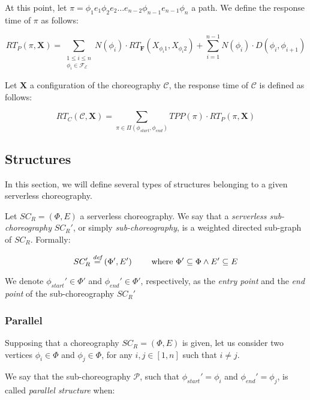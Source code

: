 At this point, let $\pi = \phi_1 e_1 \phi_2 e_2 \ldots e_{n-2}\phi_{n-1} e_{n-1} \phi_n$ a path. We define the response time of $\pi$ as follows:

\begin{equation}
	RT_P(\pi, \textbf{X}) = \sum_{\substack{1\le i\le n\\ \phi_i \in \mathscr{F_E}}} N(\phi_i) \cdot RT_{\textbf{F}} (X_{\phi_{i}1},X_{\phi_{i}2}) + \sum_{i = 1}^{n-1} N(\phi_i) \cdot D(\phi_i,\phi_{i+1})
\end{equation}

Let $\textbf{X}$ a configuration of the choreography $\mathcal{C}$, the response time of $\mathcal{C}$ is defined as follows:

\begin{equation}
	RT_C(\mathcal{C}, \textbf{X}) = \sum_{\pi \in \Pi(\phi_{start}, \phi_{end})} TPP(\pi) \cdot RT_{P}(\pi, \textbf{X})
\end{equation}

\subsection{Structures}

In this section, we will define several types of structures belonging to a given serverless choreography. 

Let $SC_R = (\Phi,E)$ a serverless choreography. We say that a \textit{serverless sub-choreography} $SC_R'$, or simply \textit{sub-choreography}, is a weighted directed sub-graph of $SC_R$. Formally:

\begin{equation}
	SC_R' \overset{\textit{def}}{=} (\Phi',E') \qquad \text{ where } \Phi' \subseteq \Phi \wedge E' \subseteq E
\end{equation}

We denote $\phi_{start}' \in \Phi'$ and $\phi_{end}' \in \Phi'$, respectively, as the \textit{entry point} and the \textit{end point} of the sub-choreography $SC_R'$

\subsubsection{Parallel}

Supposing that a choreography $SC_R = (\Phi,E)$ is given, let us consider two vertices $\phi_i \in \Phi$ and $\phi_j \in \Phi$, for any $i,j \in \left[ 1, n \right]$ such that $i \neq j$.

We say that the sub-choreography $\mathcal{P}$, such that $\phi_{start}' = \phi_i$ and $\phi_{end}' = \phi_j$, is called \textit{parallel structure} when:

